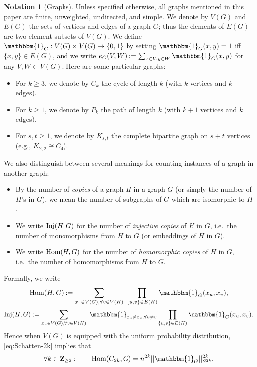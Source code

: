 \documentclass[reqno,11pt]{amsart}
\theoremstyle{definition}
\newtheorem{notation}[theorem]{Notation}
\theoremstyle{remark}
\numberwithin{equation}{section}
\newcommand{\Z}{\mathbf{Z}}
\newcommand{\one}{\mathbbm{1}}
\newcommand{\Hom}{\textnormal{Hom}}
\newcommand{\Inj}{\textnormal{Inj}}
\begin{document}
\begin{notation}[Graphs] \label{not:graphs}
Unless specified otherwise, all graphs mentioned in this paper are finite, unweighted, undirected, and simple. We denote by $V(G)$ and $E(G)$ the sets of vertices and edges of a graph $G$; thus the elements of $E(G)$ are two-element subsets of $V(G)$. We define $\one_G : V(G) \times V(G) \to \{0, 1\}$ by setting $\one_G(x, y) = 1$ iff $\{x, y\} \in E(G)$, and we write $e_G(V, W) := \sum_{x \in V, y \in W} \one_G(x, y)$ for any $V, W \subset V(G)$. Here are some particular graphs:
\begin{itemize}
    \item For $k \ge 3$, we denote by $C_k$ the cycle of length $k$ (with $k$ vertices and $k$ edges).
    \item For $k \ge 1$, we denote by $P_k$ the path of length $k$ (with $k+1$ vertices and $k$ edges).
    \item For $s, t \ge 1$, we denote by $K_{s,t}$ the complete bipartite graph on $s + t$ vertices (e.g., $K_{2,2} \cong C_4$).
\end{itemize}
We also distinguish between several meanings for counting instances of a graph in another graph:
\begin{itemize}
    \item[(1).] By the number of \emph{copies} of a graph $H$ in a graph $G$ (or simply the number of $H$'s in $G$), we mean the number of subgraphs of $G$ which are isomorphic to $H$. 
    \item[(2).] We write $\Inj(H, G)$ for the number of \emph{injective copies} of $H$ in $G$, i.e.\ the number of monomorphisms from $H$ to $G$ (or embeddings of $H$ in $G$).
    \item[(3).] We write $\Hom(H, G)$ for the number of \emph{homomorphic copies} of $H$ in $G$, i.e.\ the number of homomorphisms from $H$ to $G$.
\end{itemize}
Formally, we write
\[
    \Hom(H, G) := \sum_{x_v \in V(G), \forall v \in V(H)}\  \prod_{\{u, v\} \in E(H)} \one_G(x_u, x_v),
\]
\[
    \Inj(H, G) := \sum_{x_v \in V(G), \forall v \in V(H)}\  \one_{x_u \neq x_v,\forall u \neq v} \prod_{\{u, v\} \in E(H)} \one_G(x_u, x_v).
\]
Hence when $V(G)$ is equipped with the uniform probability distribution, \cref{eq:Schatten-2k} implies that
    \begin{equation}\label{eq:2k-cycles}
        \forall k \in \Z_{\ge 2} : \qquad 
        \Hom(C_{2k}, G) = n^{2k} ||\one_{G}||_{S^{2k}}^{2k}.
    \end{equation}
\end{notation}
\end{document}

